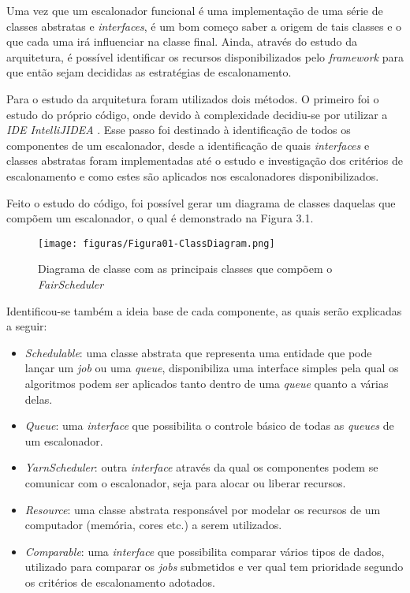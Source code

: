 Uma vez que um escalonador funcional é uma implementação de uma série de classes abstratas e \emph{interfaces}, é um bom começo saber a origem de tais classes e o que cada uma irá influenciar na classe final. Ainda, através do estudo da arquitetura, é possível identificar os recursos disponibilizados pelo \emph{framework} para que então sejam decididas as estratégias de escalonamento.

Para o estudo da arquitetura foram utilizados dois métodos. O primeiro foi o estudo do próprio código, onde devido à complexidade decidiu-se por utilizar a \emph{IDE IntelliJIDEA} \cite{IDEA}. Esse passo foi destinado à identificação de todos os componentes de um escalonador, desde a identificação de quais \emph{interfaces} e classes abstratas foram implementadas até o estudo e investigação dos critérios de escalonamento e como estes são aplicados nos escalonadores disponibilizados.

Feito o estudo do código, foi possível gerar um diagrama de classes daquelas que compõem um escalonador, o qual é demonstrado na Figura 3.1.

\begin{figure}[hbtn]
   \centering
   \texttt{[image: figuras/Figura01-ClassDiagram.png]}
   \caption{Diagrama de classe com as principais classes que compõem o \emph{FairScheduler}}
   \label{fig:Diagrama de Classes}
\end{figure}

Identificou-se também a ideia base de cada componente, as quais serão explicadas a seguir:

\begin{itemize}
	\item \emph{Schedulable}: uma classe abstrata que representa uma entidade que pode lançar um \emph{job} ou uma \emph{queue}, disponibiliza uma interface simples pela qual os algoritmos podem ser aplicados tanto dentro de uma \emph{queue} quanto a várias delas.
	\item \emph{Queue}: uma \emph{interface} que possibilita o controle básico de todas as \emph{queues} de um escalonador.
	\item \emph{YarnScheduler}: outra \emph{interface} através da qual os componentes podem se comunicar com o escalonador, seja para alocar ou liberar recursos.
	\item \emph{Resource}: uma classe abstrata responsável por modelar os recursos de um computador (memória, cores etc.) a serem utilizados.
	\item \emph{Comparable}: uma \emph{interface} que possibilita comparar vários tipos de dados, utilizado para comparar os \emph{jobs} submetidos e ver qual tem prioridade segundo os critérios de escalonamento adotados.
\end{itemize}

